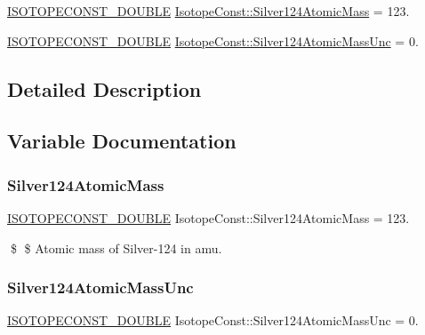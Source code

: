 \begin{DoxyCompactItemize}
\item 
\mbox{\hyperlink{group___isotope_const-_macros_ga8f45a7272ce02c0b4c65c44636ed719a}{I\+S\+O\+T\+O\+P\+E\+C\+O\+N\+S\+T\+\_\+\+D\+O\+U\+B\+LE}} \mbox{\hyperlink{group___isotope_const-_silver-_ag124_gadb4f6f207401ac87e82db2ebf0e02723}{Isotope\+Const\+::\+Silver124\+Atomic\+Mass}} = 123.
\item 
\mbox{\hyperlink{group___isotope_const-_macros_ga8f45a7272ce02c0b4c65c44636ed719a}{I\+S\+O\+T\+O\+P\+E\+C\+O\+N\+S\+T\+\_\+\+D\+O\+U\+B\+LE}} \mbox{\hyperlink{group___isotope_const-_silver-_ag124_ga9a6c9a0d2f53187668f6d21007203244}{Isotope\+Const\+::\+Silver124\+Atomic\+Mass\+Unc}} = 0.
\end{DoxyCompactItemize}


\subsection{Detailed Description}


\subsection{Variable Documentation}
\mbox{\label{group___isotope_const-_silver-_ag124_gadb4f6f207401ac87e82db2ebf0e02723}} 
\subsubsection{\texorpdfstring{Silver124\+Atomic\+Mass}{Silver124AtomicMass}}
{\footnotesize\ttfamily \mbox{\hyperlink{group___isotope_const-_macros_ga8f45a7272ce02c0b4c65c44636ed719a}{I\+S\+O\+T\+O\+P\+E\+C\+O\+N\+S\+T\+\_\+\+D\+O\+U\+B\+LE}} Isotope\+Const\+::\+Silver124\+Atomic\+Mass = 123.}

\$ \$ Atomic mass of Silver-\/124 in amu. \mbox{\label{group___isotope_const-_silver-_ag124_ga9a6c9a0d2f53187668f6d21007203244}} 
\subsubsection{\texorpdfstring{Silver124\+Atomic\+Mass\+Unc}{Silver124AtomicMassUnc}}
{\footnotesize\ttfamily \mbox{\hyperlink{group___isotope_const-_macros_ga8f45a7272ce02c0b4c65c44636ed719a}{I\+S\+O\+T\+O\+P\+E\+C\+O\+N\+S\+T\+\_\+\+D\+O\+U\+B\+LE}} Isotope\+Const\+::\+Silver124\+Atomic\+Mass\+Unc = 0.}


